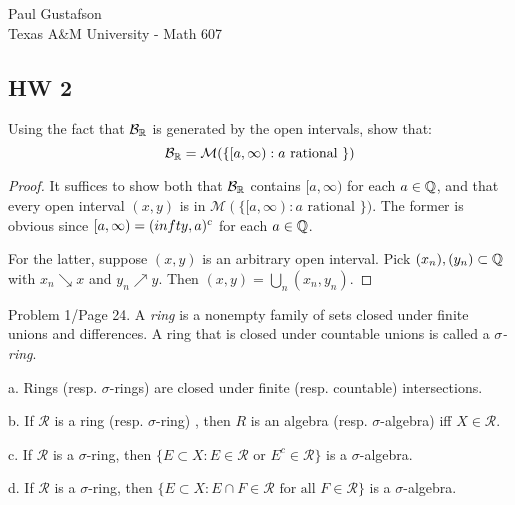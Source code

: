 \documentclass{article}
\begin{document}
\noindent Paul Gustafson\\
\noindent Texas A\&M University - Math 607\\ 

\subsection*{HW 2}
 Using the fact that $\mathcal B_{\mathbb{R}}$ is generated by the open intervals, show that:
$$ \mathcal B_{\mathbb{R}} = \mathcal M (\{ [a, \infty ) : a \text { rational } \} ) $$
\begin{proof}
It suffices to show both that $\mathcal B_{\mathbb{R}}$ contains $[a, \infty )$ for each $a \in \mathbb{Q}$, and that every open interval $(x,y)$ is in $\mathcal M (\{ [a, \infty ) : a \text { rational } \} )$. The former is obvious since $[a, \infty) = (\-infty, a)^c$ for each $a \in \mathbb{Q}$. 

For the latter, suppose $(x,y)$ is an arbitrary open interval. Pick $(x_n), (y_n) \subset \mathbb{Q}$ with $x_n \searrow x$ and $y_n \nearrow y$. Then $(x,y) = \bigcup_n (x_n, y_n)$.
\end{proof}

 Problem 1/Page 24. A \emph{ring} is a nonempty family of sets closed under finite unions and differences. A ring that is closed under countable unions is called a \emph{$\sigma$-ring}.

a. Rings (resp. $\sigma$-rings)  are closed under finite (resp. countable) intersections.

b. If $\mathcal R$ is a ring (resp. $\sigma$-ring) , then $R$ is an algebra (resp. $\sigma$-algebra) iff $X \in \mathcal R$.

c. If $\mathcal R$ is a $\sigma$-ring, then $\{ E \subset X : E \in \mathcal R \text{ or } E^c \in \mathcal R \}$ is a $\sigma$-algebra.

d. If $\mathcal R$ is a $\sigma$-ring, then $\{ E \subset X : E \cap F \in \mathcal R \text{ for all } F \in \mathcal R \}$ is a $\sigma$-algebra.
\end{document}
